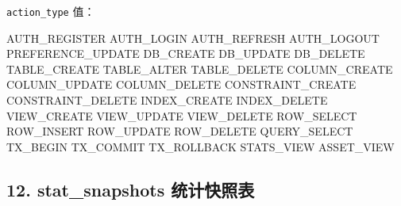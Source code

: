 \documentclass[
  a4paper,
  UTF8]{ctexart}
\newenvironment{Shaded}{}{}
\newcommand{\NormalTok}[1]{#1}
\begin{document}
\texttt{action\_type} 值：

\begin{Shaded}
\begin{Highlighting}[]
\NormalTok{AUTH\_REGISTER}
\NormalTok{AUTH\_LOGIN}
\NormalTok{AUTH\_REFRESH}
\NormalTok{AUTH\_LOGOUT}
\NormalTok{PREFERENCE\_UPDATE}
\NormalTok{DB\_CREATE}
\NormalTok{DB\_UPDATE}
\NormalTok{DB\_DELETE}
\NormalTok{TABLE\_CREATE}
\NormalTok{TABLE\_ALTER}
\NormalTok{TABLE\_DELETE}
\NormalTok{COLUMN\_CREATE}
\NormalTok{COLUMN\_UPDATE}
\NormalTok{COLUMN\_DELETE}
\NormalTok{CONSTRAINT\_CREATE}
\NormalTok{CONSTRAINT\_DELETE}
\NormalTok{INDEX\_CREATE}
\NormalTok{INDEX\_DELETE}
\NormalTok{VIEW\_CREATE}
\NormalTok{VIEW\_UPDATE}
\NormalTok{VIEW\_DELETE}
\NormalTok{ROW\_SELECT}
\NormalTok{ROW\_INSERT}
\NormalTok{ROW\_UPDATE}
\NormalTok{ROW\_DELETE}
\NormalTok{QUERY\_SELECT}
\NormalTok{TX\_BEGIN}
\NormalTok{TX\_COMMIT}
\NormalTok{TX\_ROLLBACK}
\NormalTok{STATS\_VIEW}
\NormalTok{ASSET\_VIEW}
\end{Highlighting}
\end{Shaded}

\hypertarget{stat_snapshots-ux7edfux8ba1ux5febux7167ux8868}{%
\subsection{12. stat\_snapshots
统计快照表}\label{stat_snapshots-ux7edfux8ba1ux5febux7167ux8868}}
\end{document}
